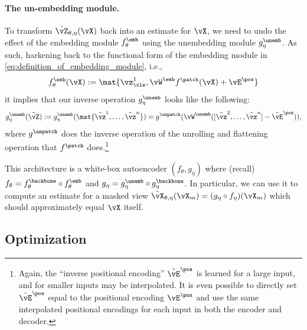 \documentclass[../../book-main.tex]{subfiles}
\begin{document}
\paragraph{The un-embedding module.} To transform \(\tilde{\vZ}_{\theta, \eta}(\vX)\) back into an estimate for \(\vX\), we need to undo the effect of the embedding module \(f_{\theta}^{\emb}\) using the unembedding module \(g_{\eta}^{\unemb}\). As such, harkening back to the functional form of the embedding module in \eqref{eq:definition_of_embedding_module}, i.e.,
\begin{equation}
    f_{\theta}^{\emb}(\vX) := \mat{\vz_{\cls}^{1}, \vW^{\emb}f^{\patch}(\vX) + \vE^{\pos}}
\end{equation}
it implies that our inverse operation \(g_{\eta}^{\unemb}\) looks like the following:
\begin{equation}
    g_{\eta}^{\unemb}(\tilde{\vZ}) := g_{\eta}^{\unemb}(\mat{\tilde{\vz}^{1}, \dots, \tilde{\vz}^{n}}) = g^{\unpatch}(\vW^{\unemb}([\tilde{\vz}^{2}, \dots, \tilde{\vz}^{n}] - \tilde{\vE}^{\pos})),
\end{equation}
where \(g^{\unpatch}\) does the inverse operation of the unrolling and flattening operation that \(f^{\patch}\) does.\footnote{Again, the ``inverse positional encoding'' \(\tilde{\vE}^{\pos}\) is learned for a large input, and for smaller inputs may be interpolated. It is even possible to directly set \(\tilde{\vE}^{\pos}\) equal to the positional encoding \(\vE^{\pos}\) and use the same interpolated positional encodings for each input in both the encoder and decoder.}

This architecture is a white-box autoencoder \((f_{\theta}, g_{\eta})\) where (recall) \(f_{\theta} = f_{\theta}^{\backbone} \circ f_{\theta}^{\emb}\) and \(g_{\eta} = g_{\eta}^{\unemb} \circ g_{\eta}^{\backbone}\). In particular, we can use it to compute an estimate for a masked view \(\hat{\vX}_{\theta, \eta}(\vX_{m}) = (g_{\eta} \circ f_{\eta})(\vX_{m})\) which should approximately equal \(\vX\) itself.

\subsection{Optimization}\label{sub:image_completion_optimization}
\end{document}
